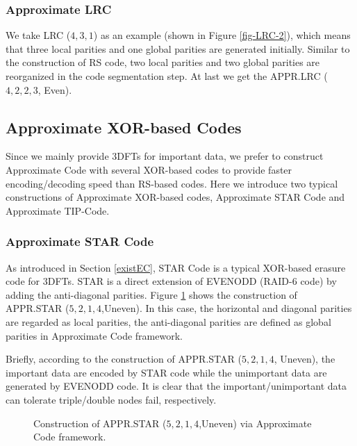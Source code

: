 \documentclass[sigconf]{acmart}
\begin{document}
\subsubsection{Approximate LRC}

We take LRC ($4, 3, 1$) \cite{LRC} as an example (shown in Figure \ref{fig-LRC-2}), which means that three local parities and one global parities are generated initially. Similar to the construction of RS code, two local parities and two global parities are reorganized in the code segmentation step. At last we get the APPR.LRC ($4, 2, 2, 3$, Even).

\subsection{Approximate XOR-based Codes}\label{APPRXOR}
Since we mainly provide 3DFTs for important data, we prefer to construct Approximate Code with several XOR-based codes to provide faster encoding/decoding speed than RS-based codes. Here we introduce two typical constructions of Approximate XOR-based codes, Approximate STAR Code and Approximate TIP-Code.

\subsubsection{Approximate STAR Code}

As introduced in Section \ref{existEC}, STAR Code \cite{STAR} is a typical XOR-based erasure code for 3DFTs. STAR is a direct extension of EVENODD\cite{EVENODD} (RAID-6 code) by adding the anti-diagonal parities. Figure \ref{fig-appr-star} shows the construction of APPR.STAR ($5,2,1,4$,Uneven). In this case, the horizontal and diagonal parities are regarded as local parities,  the anti-diagonal parities are defined as global parities in Approximate Code framework.

Briefly, according to the construction of APPR.STAR ($5,2,1,4$, Uneven), the important data are encoded by STAR code while the unimportant data are generated by EVENODD code. It is clear that the important/unimportant data can tolerate triple/double nodes fail, respectively.

\begin{figure}[ht]
\centering
{}

\caption{Construction of APPR.STAR  ($5,2,1,4$,Uneven) via Approximate Code framework.}\label{fig-appr-star}
\end{figure}
\end{document}
